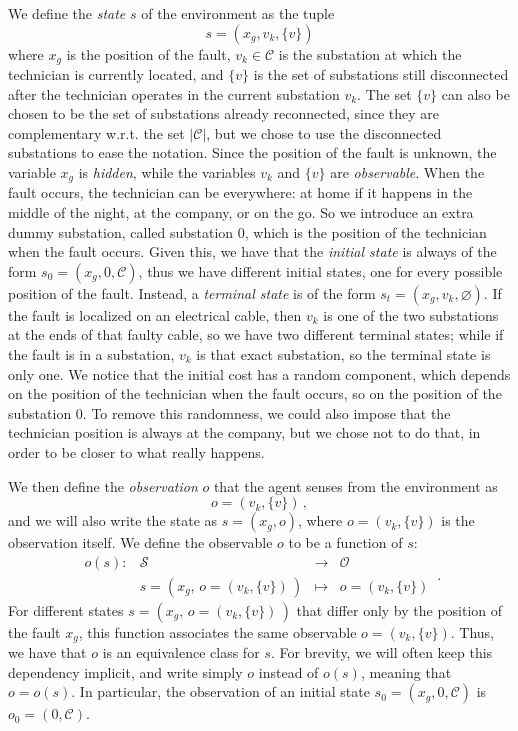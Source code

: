 We define the \emph{state} $s$ of the environment as the tuple
\begin{equation}
    s = (x_g, v_k, \{v\})
\end{equation}
where $x_g$ is the position of the fault, $v_k \in \mathcal C$ is the substation at which the technician is currently located, and $\{v\}$ is the set of substations still disconnected after the technician operates in the current substation $v_k$. The set $\{v\}$ can also be chosen to be the set of substations already reconnected, since they are complementary w.r.t. the set $|\mathcal C|$, but we chose to use the disconnected substations to ease the notation. Since the position of the fault is unknown, the variable $x_g$ is \emph{hidden}, while the variables $v_k$ and $\{v\}$ are \emph{observable}. When the fault occurs, the technician can be everywhere: at home if it happens in the middle of the night, at the company, or on the go. So we introduce an extra dummy substation, called substation $0$, which is the position of the technician when the fault occurs. Given this, we have that the \emph{initial state} is always of the form $s_0 = (x_g, 0, \mathcal C)$, thus we have different initial states, one for every possible position of the fault. Instead, a \emph{terminal state} is of the form $s_t = (x_g, v_k, \varnothing)$. If the fault is localized on an electrical cable, then $v_k$ is one of the two substations at the ends of that faulty cable, so we have two different terminal states; while if the fault is in a substation, $v_k$ is that exact substation, so the terminal state is only one. We notice that the initial cost has a random component, which depends on the position of the technician when the fault occurs, so on the position of the substation $0$. To remove this randomness, we could also impose that the technician position is always at the company, but we chose not to do that, in order to be closer to what really happens.

We then define the \emph{observation} $o$ that the agent senses from the environment as
\begin{equation}
    o = (v_k, \{v\}) \, ,
\end{equation}
and we will also write the state as $s=(x_g, o)$, where $o = (v_k, \{v\})$ is the observation itself. We define the observable $o$ to be a function of $s$:
\begin{equation}
    \begin{array}{cccc}
    o(s): & \mathcal S                                     & \rightarrow & \mathcal O       \\
          & s = (x_g, \, o = \left( v_k, \{v\} \right) \,) & \mapsto     & o = (v_k, \{v\})
\end{array} \, .
\end{equation}
For different states $s = (x_g, \, o = \left( v_k, \{v\} \right) \,)$ that differ only by the position of the fault $x_g$, this function associates the same observable $o = (v_k, \{v\})$. Thus, we have that $o$ is an equivalence class for $s$. For brevity, we will often keep this dependency implicit, and write simply $o$ instead of $o(s)$, meaning that $o = o(s)$. In particular, the observation of an initial state $s_0 = (x_g, 0, \mathcal C)$ is $o_0 = (0, \mathcal C)$.

